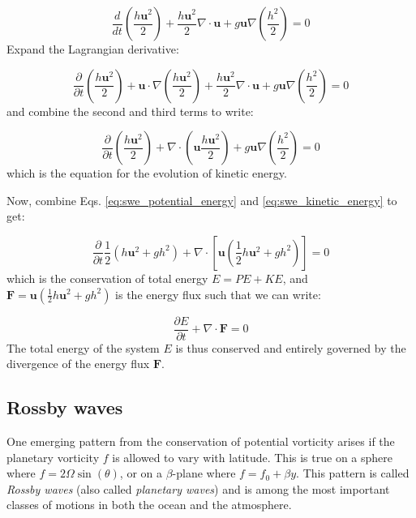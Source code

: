 \documentclass[12pt]{article}
\numberwithin{equation}{section}
\numberwithin{figure}{section}
\numberwithin{table}{section}
\begin{document}
\begin{equation}
  \frac{d}{dt} \left( \frac{h \mathbf{u}^2}{2} \right)
  + \frac{h\mathbf{u}^2}{2} \nabla \cdot \mathbf{u}
  + g\mathbf{u}\nabla \left(\frac{h^2}{2}\right)
  = 0
\end{equation}
Expand the Lagrangian derivative:

\begin{equation}
  \frac{\partial}{\partial t} \left( \frac{h \mathbf{u}^2}{2} \right)
  + \mathbf{u} \cdot \nabla \left( \frac{h \mathbf{u}^2}{2} \right)
  + \frac{h\mathbf{u}^2}{2} \nabla \cdot \mathbf{u}
  + g\mathbf{u}\nabla \left(\frac{h^2}{2}\right)
  = 0
\end{equation}
and combine the second and third terms to write:

\begin{equation}
  \frac{\partial}{\partial t} \left( \frac{h \mathbf{u}^2}{2} \right)
  + \nabla \cdot \left( \mathbf{u} \frac{h \mathbf{u}^2}{2} \right)
  + g\mathbf{u}\nabla \left(\frac{h^2}{2}\right)
  = 0
  \label{eq:swe_kinetic_energy}
\end{equation}
which is the equation for the evolution of kinetic energy.

Now, combine Eqs. \ref{eq:swe_potential_energy} and \ref{eq:swe_kinetic_energy} to get:

\begin{equation}
  \frac{\partial}{\partial t} \frac{1}{2} \left(h\mathbf{u}^2 + gh^2\right)
  + \nabla \cdot \left[ \mathbf{u} \left( \frac{1}{2} h\mathbf{u}^2 + gh^2\right) \right] = 0
\end{equation}
which is the conservation of total energy $E = PE + KE$, and
$\mathbf{F} = \mathbf{u} \left( \frac{1}{2} h\mathbf{u}^2 + gh^2\right)$ is the energy flux
such that we can write:

\begin{equation}
  \frac{\partial E}{\partial t} + \nabla \cdot \mathbf{F} = 0
\end{equation}
The total energy of the system $E$ is thus conserved and entirely governed by
the divergence of the energy flux $\mathbf{F}$.

\subsection{Rossby waves}

One emerging pattern from the conservation of potential vorticity arises if
the planetary vorticity $f$ is allowed to vary with latitude.
This is true on a sphere where $f = 2 \Omega \sin(\theta)$, or on a $\beta$-plane
where $f = f_0 + \beta y$.
This pattern is called \textit{Rossby waves} (also called
\textit{planetary waves}) and is among the most important
classes of motions in both the ocean and the atmosphere.
\end{document}
